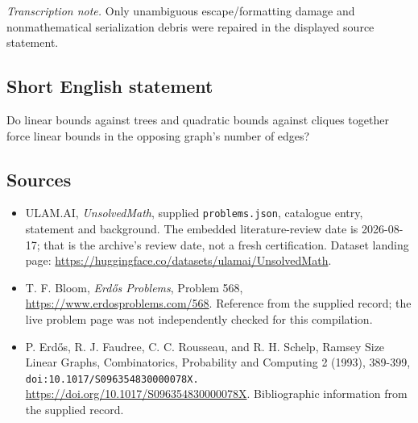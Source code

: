 \documentclass[11pt,a4paper]{article}
\begin{document}
{\small\emph{Transcription note.} Only unambiguous escape/formatting damage and nonmathematical serialization debris were repaired in the displayed source statement.}

\subsection{Short English statement}

Do linear bounds against trees and quadratic bounds against cliques together force linear bounds in the opposing graph's number of edges?

\subsection{Sources}

{\small

\begin{itemize}

\item[\hypertarget{source:statement:1}{S1}] ULAM.AI, \emph{UnsolvedMath}, supplied \texttt{problems.json}, catalogue entry, statement and background. The embedded literature-review date is 2026-08-17; that is the archive’s review date, not a fresh certification. Dataset landing page: \url{https://huggingface.co/datasets/ulamai/UnsolvedMath}.

\item[\hypertarget{source:statement:2}{S2}] T. F. Bloom, \emph{Erdős Problems}, Problem 568, \url{https://www.erdosproblems.com/568}. Reference from the supplied record; the live problem page was not independently checked for this compilation.

\item[\hypertarget{source:statement:3}{S3}] P. Erdős, R. J. Faudree, C. C. Rousseau, and R. H. Schelp, Ramsey Size Linear Graphs, Combinatorics, Probability and Computing 2 (1993), 389-399, \nolinkurl{doi:10.1017/S096354830000078X.} \url{https://doi.org/10.1017/S096354830000078X}. Bibliographic information from the supplied record.

\end{itemize}

}

\label{end:statement}
\end{document}
